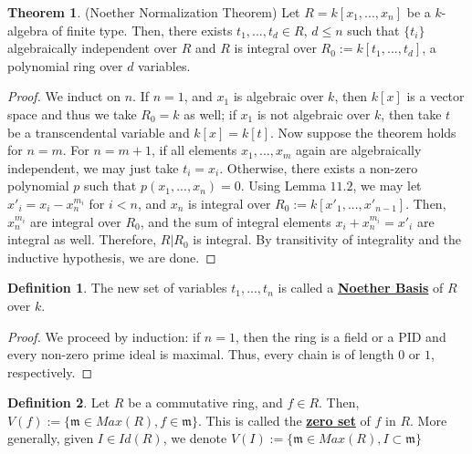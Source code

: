 \documentclass{article}
\theoremstyle{definition}
\newtheorem{theorem}{Theorem}[section]
\theoremstyle{definition}
\theoremstyle{definition}
\theoremstyle{definition}
\theoremstyle{definition}
\newtheorem{definition}{Definition}[section]
\theoremstyle{definition}
\theoremstyle{definition}
\begin{document}
\begin{tcolorbox}[colback=red!5!white,colframe=red!30!white]
\begin{theorem}
(Noether Normalization Theorem) Let $R=k[x_1,...,x_n]$ be a $k$-algebra of finite type. Then, there exists $t_1,...,t_d\in R$, $d\leq n$ such that $\{t_i\}$ algebraically independent over $R$ and $R$ is integral over $R_0:=k[t_1,...,t_d]$, a polynomial ring over $d$ variables.  
\end{theorem}
\end{tcolorbox}
\begin{proof}
We induct on $n$. If $n=1$, and $x_1$ is algebraic over $k$, then $k[x]$ is a vector space and thus we take $R_0=k$ as well; if $x_1$ is not algebraic over $k$, then take $t$ be a transcendental variable and $k[x]=k[t]$. Now suppose the theorem holds for $n=m$. For $n=m+1$, if all elements $x_1,...,x_m$ again are algebraically independent, we may just take $t_i=x_i$. Otherwise, there exists a non-zero polynomial $p$ such that $p(x_1,...,x_n)=0$. Using Lemma $11.2$, we may let $x'_i=x_i-x_n^{m_i}$ for $i<n$, and $x_n$ is integral over $R_0:=k[x'_1,...,x'_{n-1}]$. Then, $x_n^{m_i}$ are integral over $R_0$, and the sum of integral elements $x_i+x_n^{m_i}=x'_i$ are integral as well. Therefore, $R|R_0$ is integral. By transitivity of integrality and the inductive hypothesis, we are done. 
\end{proof}



\begin{tcolorbox}[colback=purple!5!white,colframe=purple!75!black]
\begin{definition}
The new set of variables $t_1,...,t_n$ is called a \underline{\textbf{Noether Basis}} of $R$ over $k$. 
\end{definition}
\end{tcolorbox}


\begin{proof}
    We proceed by induction: if $n=1$, then the ring is a field or a PID and every non-zero prime ideal is maximal. Thus, every chain is of length $0$ or $1$, respectively.  
\end{proof}


\begin{tcolorbox}[colback=purple!5!white,colframe=purple!75!black]
\begin{definition}
Let $R$ be a commutative ring, and $f\in R$. Then, $V(f):=\{\mathfrak{m}\in Max(R), f\in \mathfrak{m}\}$. This is called the \underline{\textbf{zero set}} of $f$ in $R$. More generally, given $I\in Id(R)$, we denote $V(I):=\{\mathfrak{m}\in Max(R), I\subset \mathfrak{m}\}$
\end{definition}
\end{tcolorbox}
\end{document}
